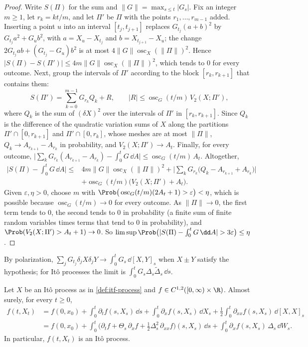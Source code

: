 \begin{proof}
Write $S(\Pi)$ for the sum and $\|G\|=\max_{s\le t}|G_s|$. Fix an integer $m\ge1$, let
$r_k=kt/m$, and let $\Pi'$ be $\Pi$ with the points $r_1,\dots,r_{m-1}$ added. Inserting a point
$u$ into an interval $[t_j,t_{j+1}]$ replaces $G_{t_j}(a+b)^2$ by $G_{t_j}a^2+G_ub^2$, with
$a=X_u-X_{t_j}$ and $b=X_{t_{j+1}}-X_u$; the change $2G_{t_j}ab+(G_{t_j}-G_u)b^2$ is at most
$4\|G\|\operatorname{osc}_X(\|\Pi\|)^2$. Hence $|S(\Pi)-S(\Pi')|\le4m\|G\|\operatorname{osc}_X(\|\Pi\|)^2$,
which tends to $0$ for every outcome. Next, group the intervals of $\Pi'$ according to the block
$[r_k,r_{k+1}]$ that contains them:
\[
  S(\Pi')=\sum_{k=0}^{m-1}G_{r_k}Q_k+R,\qquad |R|\le\operatorname{osc}_G(t/m)\,V_2(X;\Pi'),
\]
where $Q_k$ is the sum of $(\delta X)^2$ over the intervals of $\Pi'$ in $[r_k,r_{k+1}]$. Since $Q_k$ is
the difference of the quadratic variation sums of $X$ along the partitions $\Pi'\cap[0,r_{k+1}]$ and
$\Pi'\cap[0,r_k]$, whose meshes are at most $\|\Pi\|$, $Q_k\to A_{r_{k+1}}-A_{r_k}$ in probability, and
$V_2(X;\Pi')\to A_t$. Finally, for every outcome,
$\big|\sum_kG_{r_k}(A_{r_{k+1}}-A_{r_k})-\int_0^tG\,\dd A\big|\le\operatorname{osc}_G(t/m)\,A_t$.
Altogether,
\begin{align*}
  \Big|S(\Pi)-\int_0^tG\,\dd A\Big|\le{}&4m\|G\|\operatorname{osc}_X(\|\Pi\|)^2
  +\Big|\sum_kG_{r_k}\big(Q_k-A_{r_{k+1}}+A_{r_k}\big)\Big|\\
  &+\operatorname{osc}_G(t/m)\big(V_2(X;\Pi')+A_t\big).
\end{align*}
Given $\varepsilon,\eta>0$, choose $m$ with
$\Prob\big(\operatorname{osc}_G(t/m)(2A_t+1)>\varepsilon\big)<\eta$, which is possible because
$\operatorname{osc}_G(t/m)\to0$ for every outcome. As $\|\Pi\|\to0$, the first term tends to $0$, the
second tends to $0$ in probability (a finite sum of finite random variables times terms that tend to
$0$ in probability), and $\Prob(V_2(X;\Pi')>A_t+1)\to0$. So
$\limsup\Prob\big(|S(\Pi)-\int_0^tG\,\dd A|>3\varepsilon\big)\le\eta$.
\end{proof}

By polarization, $\sum_jG_{t_j}\delta_jX\delta_jY\to\int_0^tG_s\,\dd[X,Y]_s$ when $X\pm Y$ satisfy the
hypothesis; for It\^o processes the limit is $\int_0^tG_s\Delta_s\tilde\Delta_s\,\dd s$.

\begin{theorem}\label{thm:itf-process}
Let $X$ be an It\^o process as in \cref{def:itf-process} and $f\in C^{1,2}([0,\infty)\times\R)$.
Almost surely, for every $t\ge0$,
\begin{align*}
  f(t,X_t)&=f(0,x_0)+\int_0^t\partial_tf(s,X_s)\,\dd s+\int_0^t\partial_xf(s,X_s)\,\dd X_s
    +\frac12\int_0^t\partial_{xx}f(s,X_s)\,\dd[X,X]_s\\
  &=f(0,x_0)+\int_0^t\Big(\partial_tf+\Theta_s\,\partial_xf+\frac12\Delta_s^2\,\partial_{xx}f\Big)(s,X_s)\,\dd s
    +\int_0^t\partial_xf(s,X_s)\,\Delta_s\,\dd W_s .
\end{align*}
In particular, $f(t,X_t)$ is an It\^o process.
\end{theorem}

